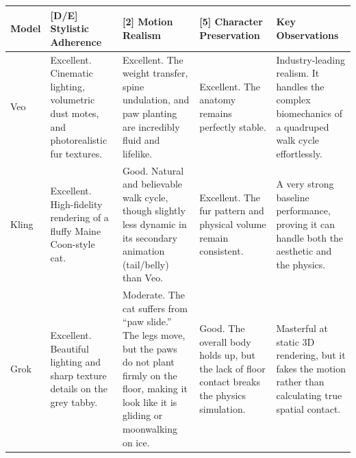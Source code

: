 \documentclass[sigconf]{acmart}
\begin{document}
\begin{table}[H]
    \centering
    \renewcommand{\arraystretch}{1.3}
    \begin{tabularx}{\textwidth}{| l | >{\raggedright\arraybackslash}X | >{\raggedright\arraybackslash}X | >{\raggedright\arraybackslash}X | >{\raggedright\arraybackslash}X |}
        \hline
        \textbf{Model} & \textbf{[D/E] Stylistic Adherence}                                                                & \textbf{[2] Motion Realism}                                                                                                                                          & \textbf{[5] Character Preservation}                                                           & \textbf{Key Observations}                                                                                                                          \\\hline
        Veo            & Excellent. Cinematic lighting, volumetric dust motes, and photorealistic fur textures.            & Excellent. The weight transfer, spine undulation, and paw planting are incredibly fluid and lifelike.                                                                & Excellent. The anatomy remains perfectly stable.                                              & Industry-leading realism. It handles the complex biomechanics of a quadruped walk cycle effortlessly.                                              \\\hline
        Kling          & Excellent. High-fidelity rendering of a fluffy Maine Coon-style cat.                              & Good. Natural and believable walk cycle, though slightly less dynamic in its secondary animation (tail/belly) than Veo.                                              & Excellent. The fur pattern and physical volume remain consistent.                             & A very strong baseline performance, proving it can handle both the aesthetic and the physics.                                                      \\\hline
        Grok           & Excellent. Beautiful lighting and sharp texture details on the grey tabby.                        & Moderate. The cat suffers from ``paw slide.'' The legs move, but the paws do not plant firmly on the floor, making it look like it is gliding or moonwalking on ice. & Good. The overall body holds up, but the lack of floor contact breaks the physics simulation. & Masterful at static 3D rendering, but it fakes the motion rather than calculating true spatial contact.                                            \\\hline

\end{tabularx}
\end{table}
\end{document}
